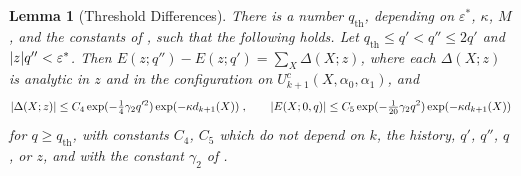 \documentclass[11pt]{preprint}
\DeclarePairedDelimiter{\abs}{\lvert}{\rvert}
\numberwithin{equation}{section}
\newtheorem{lemma}{Lemma}[section]
\theoremstyle{definition}
\theoremstyle{remark}
\theoremstyle{plain}
\begin{document}
\begin{lemma}[Threshold Differences]\label{lem:threshold-differences}
There is a number $q_{\mathrm{th}}$, depending on $\varepsilon^*$, $\kappa$, $M$, and the constants of \cite{BalabanRG2}, such that the following holds. Let $q_{\mathrm{th}} \leq q' < q'' \leq 2q'$ and $\abs{z}q'' < \varepsilon^*$. Then $E(z; q'') - E(z; q') = \sum_X\Delta(X; z)$, where each $\Delta(X; z)$ is analytic in $z$ and in the configuration on $U^c_{k+1}(X, \alpha_0, \alpha_1)$, and
\begin{equation}\label{eq:threshold-difference}
    \abs{\Delta(X; z)} \leq C_4\exp(-\tfrac14\gamma_2q'^2)\exp(-\kappa d_{k+1}(X))\;,
    \qquad
    \abs{E(X; 0, q)} \leq C_5\exp(-\tfrac{1}{20}\gamma_2q^2)\exp(-\kappa d_{k+1}(X))
\end{equation}
for $q \geq q_{\mathrm{th}}$, with constants $C_4$, $C_5$ which do not depend on $k$, the history, $q'$, $q''$, $q$, or $z$, and with the constant $\gamma_2$ of \cite[(2.22)]{BalabanRG2}.
\end{lemma}
\end{document}

